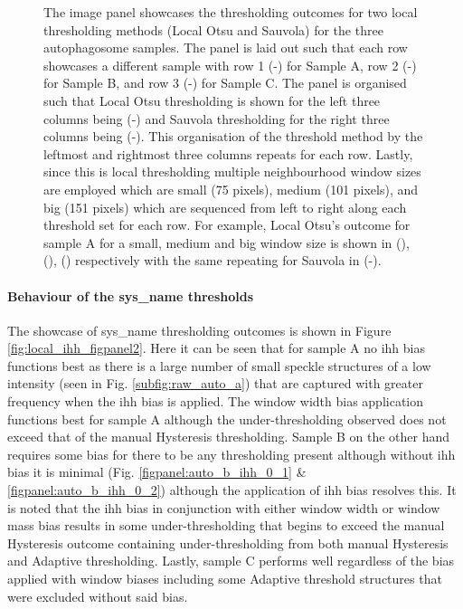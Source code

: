 \begin{figure}[h!]
    \caption[Image panel showcasing the thresholding outcome of autophagosome samples using local thresholding methods for different window sizes]{The image panel showcases the thresholding outcomes for two local thresholding methods (Local Otsu and Sauvola) for the three autophagosome samples. The panel is laid out such that each row showcases a different sample with row 1 (-) for Sample A, row 2 (-) for Sample B, and row 3 (-) for Sample C. The panel is organised such that Local Otsu thresholding is shown for the left three columns being (-) and Sauvola thresholding for the right three columns being (-). This organisation of the threshold method by the leftmost and rightmost three columns repeats for each row. Lastly, since this is local thresholding multiple neighbourhood window sizes are employed which are small (75 pixels), medium (101 pixels), and big (151 pixels) which are sequenced from left to right along each threshold set for each row. For example, Local Otsu's outcome for sample A for a small, medium and big window size is shown in (), (), () respectively with the same repeating for Sauvola in (-).}
    \label{fig:local_figpanel2}
\end{figure}

\paragraph{Behaviour of the \gls{sys_name} thresholds}
The showcase of \gls{sys_name} thresholding outcomes is shown in Figure \ref{fig:local_ihh_figpanel2}. Here it can be seen that for sample A no \gls{ihh} bias functions best as there is a large number of small speckle structures of a low intensity (seen in Fig. \ref{subfig:raw_auto_a}) that are captured with greater frequency when the \gls{ihh} bias is applied. The window width bias application functions best for sample A although the under-thresholding observed does not exceed that of the manual Hysteresis thresholding. Sample B on the other hand requires some bias for there to be any thresholding present although without \gls{ihh} bias it is minimal (Fig. \ref{figpanel:auto_b_ihh_0_1} \& \ref{figpanel:auto_b_ihh_0_2}) although the application of \gls{ihh} bias resolves this. It is noted that the \gls{ihh} bias in conjunction with either window width or window mass bias results in some under-thresholding that begins to exceed the manual Hysteresis outcome containing under-thresholding from both manual Hysteresis and Adaptive thresholding. Lastly, sample C performs well regardless of the bias applied with window biases including some Adaptive threshold structures that were excluded without said bias.


